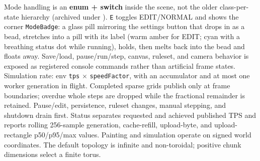 \begin{statusbox}
Mode handling is an \textbf{enum + switch} inside the scene, not the older
class-per-state hierarchy (archived under ).
\texttt{E} toggles EDIT/NORMAL and shows the corner \texttt{ModeBadge}: a glass
pill mirroring the settings button that drops in as a bead, stretches into a
pill with its label (warm amber for EDIT; cyan with a breathing status dot
while running), holds, then melts back into the bead and floats away.
Save/load, pause/run/step, canvas, ruleset, and camera behavior is exposed as
registered console commands rather than artificial frame states.
Simulation rate: env \texttt{tps} $\times$ \texttt{speedFactor}, with an
accumulator and at most one worker generation in flight. Completed sparse grids
publish only at frame boundaries; overdue whole steps are dropped while the
fractional remainder is retained. Pause/edit, persistence, ruleset changes,
manual stepping, and shutdown drain first. Status separates requested and
achieved published TPS and reports rolling 256-sample generation, cache-refill,
upload-byte, and upload-rectangle p50/p95/max values. Painting and simulation
operate on signed world coordinates. The default topology is infinite and
non-toroidal; positive chunk dimensions select a finite torus.
\end{statusbox}

